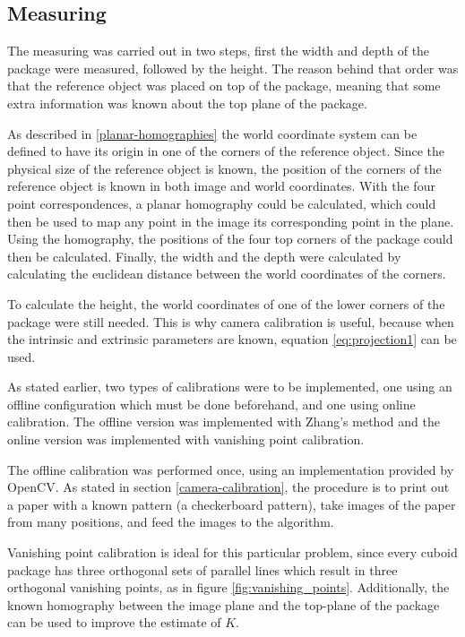 \subsection{Measuring}
The measuring was carried out in two steps, first the width and depth of the package were measured, followed by the height. 
The reason behind that order was that the reference object was placed on top of the package, meaning that some extra information was known about the  top plane of the package.

As described in \ref{planar-homographies} the world coordinate system can be defined to have its origin in one of the corners of the reference object.
Since the physical size of the reference object is known, the position of the corners of the reference object is known in both image and world coordinates.
With the four point correspondences, a planar homography could be calculated, which could then be used to map any point in the image its corresponding point in the plane.
Using the homography, the positions of the four top corners of the package could then be calculated. 
Finally, the width and the depth were calculated by calculating the euclidean distance between the world coordinates of the corners.

To calculate the height, the world coordinates of one of the lower corners of the package were still needed.
This is why camera calibration is useful, because when the intrinsic and extrinsic parameters are known, equation \ref{eq:projection1} can be used.

As stated earlier, two types of calibrations were to be implemented, one using an offline configuration which must be done beforehand, and one using online calibration.
The offline version was implemented with Zhang's method and the online version was implemented with vanishing point calibration.

The offline calibration was performed once, using an implementation provided by OpenCV.
As stated in section \ref{camera-calibration}, the procedure is to print out a paper with a known pattern (a checkerboard pattern), take images of the paper from many positions, and feed the images to the algorithm.

Vanishing point calibration is ideal for this particular problem, since every cuboid package has three orthogonal sets of parallel lines which result in three orthogonal vanishing points, as in figure \ref{fig:vanishing_points}.
Additionally, the known homography between the image plane and the top-plane of the package can be used to improve the estimate of $K$.

